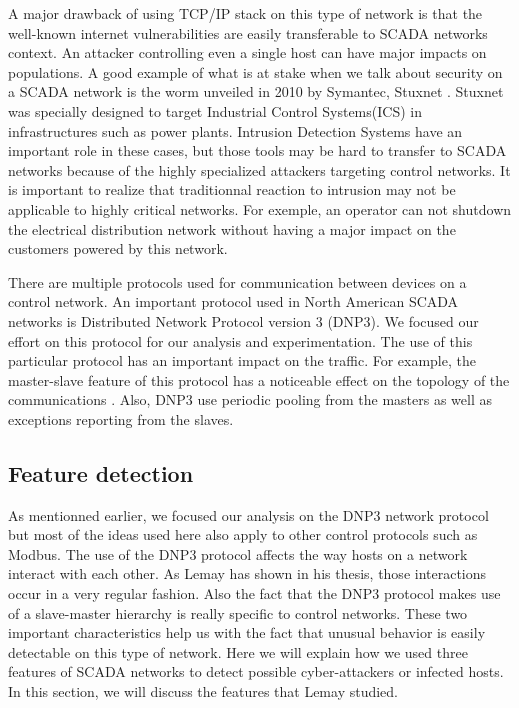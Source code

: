 \documentclass[12pt,journal,compsoc]{IEEEtran}
\begin{document}
\begin{empfile}
A major drawback of using TCP/IP stack on this type of network is that the well-known internet vulnerabilities are easily transferable to SCADA networks context. An attacker controlling even a single host can have major impacts on populations. A good example of what is at stake when we talk about security on a SCADA network is the worm unveiled in 2010 by Symantec, Stuxnet \cite{symantec:stuxnet}. Stuxnet was specially designed to target Industrial Control Systems(ICS) in infrastructures such as power plants. Intrusion Detection Systems have an important role in these cases, but those tools may be hard to transfer to SCADA networks because of the highly specialized attackers targeting control networks. It is important to realize that traditionnal reaction to intrusion may not be applicable to highly critical networks. For exemple, an operator can not shutdown the electrical distribution network without having a major impact on the customers powered by this network.

There are multiple protocols used for communication between devices on a control network. An important protocol used in North American SCADA networks is Distributed Network Protocol version 3 (DNP3)\cite{lemay}. We focused our effort on this protocol for our analysis and experimentation. The use of this particular protocol has an important impact on the traffic. For example, the master-slave feature of this protocol has a noticeable effect on the topology of the communications \cite{clark}. Also, DNP3 use periodic pooling from the masters as well as exceptions reporting from the slaves\cite{lemay}. 

\subsection{Feature detection}
\label{subsectionFeature}
As mentionned earlier, we focused our analysis on the DNP3 network protocol but most of the ideas used here also apply to other control protocols such as Modbus. The use of the DNP3 protocol affects the way hosts on a network interact with each other. As Lemay \cite{lemay} has shown in his thesis, those interactions occur in a very regular fashion. Also the fact that the DNP3 protocol makes use of a slave-master hierarchy is really specific to control networks. These two important characteristics help us with the fact that unusual behavior is easily detectable on this type of network. Here we will explain how we used three features of SCADA networks to detect possible cyber-attackers or infected hosts. In this section, we will discuss the features that Lemay studied.


\end{empfile}
\end{document}

